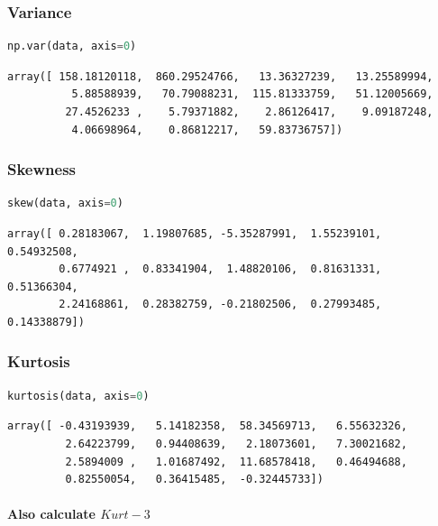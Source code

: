 \hypertarget{variance}{%
\subsubsection{Variance}\label{variance}}

\begin{lstlisting}[language=Python]
np.var(data, axis=0)
\end{lstlisting}

\begin{lstlisting}
array([ 158.18120118,  860.29524766,   13.36327239,   13.25589994,
          5.88588939,   70.79088231,  115.81333759,   51.12005669,
         27.4526233 ,    5.79371882,    2.86126417,    9.09187248,
          4.06698964,    0.86812217,   59.83736757])
\end{lstlisting}

\hypertarget{skewness}{%
\subsubsection{Skewness}\label{skewness}}

\begin{lstlisting}[language=Python]
skew(data, axis=0)
\end{lstlisting}

\begin{lstlisting}
array([ 0.28183067,  1.19807685, -5.35287991,  1.55239101,  0.54932508,
        0.6774921 ,  0.83341904,  1.48820106,  0.81631331,  0.51366304,
        2.24168861,  0.28382759, -0.21802506,  0.27993485,  0.14338879])
\end{lstlisting}

\hypertarget{kurtosis}{%
\subsubsection{Kurtosis}\label{kurtosis}}

\begin{lstlisting}[language=Python]
kurtosis(data, axis=0)
\end{lstlisting}

\begin{lstlisting}
array([ -0.43193939,   5.14182358,  58.34569713,   6.55632326,
         2.64223799,   0.94408639,   2.18073601,   7.30021682,
         2.5894009 ,   1.01687492,  11.68578418,   0.46494688,
         0.82550054,   0.36415485,  -0.32445733])
\end{lstlisting}

\hypertarget{also-calculate-kurt---3}{%
\paragraph{\texorpdfstring{Also calculate
\(Kurt - 3\)}{Also calculate Kurt - 3}}\label{also-calculate-kurt---3}}

